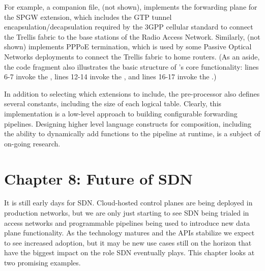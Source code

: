 \documentclass[letterpaper,11pt,english]{sphinxmanual}
\begin{document}
\begin{sphinxVerbatim}[commandchars=\\\{\},numbers=left,firstnumber=1,stepnumber=1]
           
           
       
\end{sphinxVerbatim}
\sphinxresetverbatimhllines

For example, a companion file,  (not shown), implements the
forwarding plane for the SPGW extension, which includes the GTP tunnel
encapsulation/decapsulation required by the 3GPP cellular standard to
connect the Trellis fabric to the base stations of the Radio Access
Network.  Similarly,  (not shown) implements PPPoE
termination, which is used by some Passive Optical Networks
deployments to connect the Trellis fabric to home routers. (As an
aside, the code fragment also illustrates the basic structure of
’s core functionality: lines 6-7 invoke the , lines 12-14 invoke the , and lines
16-17 invoke the .)

In addition to selecting which extensions to include, the pre-processor
also defines several constants, including the size of each logical
table.  Clearly, this implementation is a low-level approach to
building configurable forwarding pipelines. Designing higher level
language constructs for composition, including the ability to
dynamically add functions to the pipeline at runtime, is a subject of
on-going research.


\chapter{Chapter 8:  Future of SDN}
\label{\detokenize{future:chapter-8-future-of-sdn}}\label{\detokenize{future::doc}}
It is still early days for SDN. Cloud-hosted control planes are being
deployed in production networks, but we are only just starting to see
SDN being trialed in access networks and programmable pipelines being
used to introduce new data plane functionality. As the technology
matures and the APIs stabilize we expect to see increased adoption,
but it may be new use cases still on the horizon that have the biggest
impact on the role SDN eventually plays. This chapter looks at two
promising examples.
\end{document}
